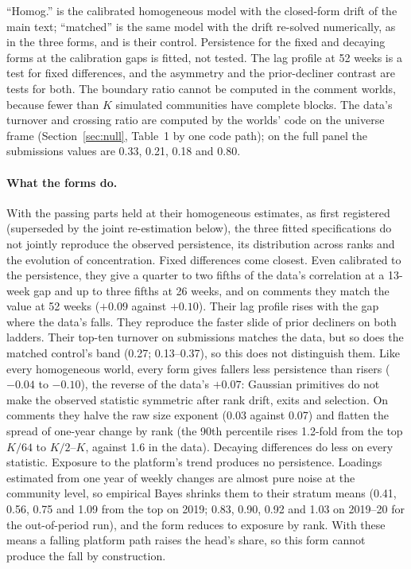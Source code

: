 \documentclass[10pt]{article}
\begin{document}
``Homog.'' is the calibrated homogeneous model with the closed-form drift of the main text; ``matched'' is the same model with the drift re-solved numerically, as in the three forms, and is their control. Persistence for the fixed and decaying forms at the calibration gaps is fitted, not tested. The lag profile at 52 weeks is a test for fixed differences, and the asymmetry and the prior-decliner contrast are tests for both. The boundary ratio cannot be computed in the comment worlds, because fewer than $K$ simulated communities have complete blocks. The data's turnover and crossing ratio are computed by the worlds' code on the universe frame (Section~\ref{sec:null}, Table~1 by one code path); on the full panel the submissions values are 0.33, 0.21, 0.18 and 0.80.
\paragraph{What the forms do.} With the passing parts held at their homogeneous estimates, as first registered (superseded by the joint re-estimation below), the three fitted specifications do not jointly reproduce the observed persistence, its distribution across ranks and the evolution of concentration. Fixed differences come closest. Even calibrated to the persistence, they give a quarter to two fifths of the data's correlation at a 13-week gap and up to three fifths at 26 weeks, and on comments they match the value at 52 weeks ($+0.09$ against $+0.10$). Their lag profile rises with the gap where the data's falls. They reproduce the faster slide of prior decliners on both ladders. Their top-ten turnover on submissions matches the data, but so does the matched control's band (0.27; 0.13--0.37), so this does not distinguish them. Like every homogeneous world, every form gives fallers less persistence than risers ($-0.04$ to $-0.10$), the reverse of the data's $+0.07$: Gaussian primitives do not make the observed statistic symmetric after rank drift, exits and selection. On comments they halve the raw size exponent (0.03 against 0.07) and flatten the spread of one-year change by rank (the 90th percentile rises 1.2-fold from the top $K/64$ to $K/2$--$K$, against 1.6 in the data). Decaying differences do less on every statistic. Exposure to the platform's trend produces no persistence. Loadings estimated from one year of weekly changes are almost pure noise at the community level, so empirical Bayes shrinks them to their stratum means (0.41, 0.56, 0.75 and 1.09 from the top on 2019; 0.83, 0.90, 0.92 and 1.03 on 2019--20 for the out-of-period run), and the form reduces to exposure by rank. With these means a falling platform path raises the head's share, so this form cannot produce the fall by construction.
\end{document}
